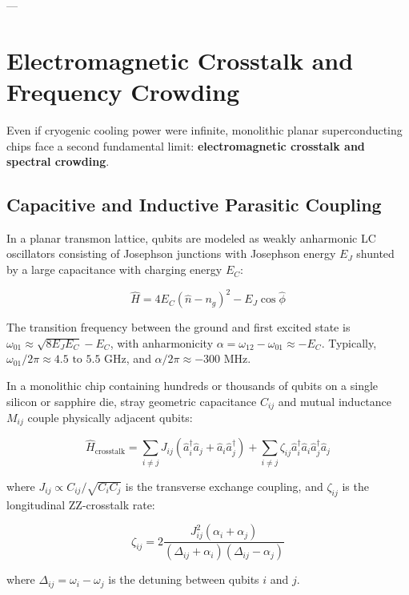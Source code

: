 ---

\section{Electromagnetic Crosstalk and Frequency Crowding}

Even if cryogenic cooling power were infinite, monolithic planar superconducting chips face a second fundamental limit: \textbf{electromagnetic crosstalk and spectral crowding}.

\subsection{Capacitive and Inductive Parasitic Coupling}
In a planar transmon lattice, qubits are modeled as weakly anharmonic LC oscillators consisting of Josephson junctions with Josephson energy $E_J$ shunted by a large capacitance with charging energy $E_C$:

\begin{equation}
    \hat{H} = 4 E_C (\hat{n} - n_g)^2 - E_J \cos \hat{\phi}
\end{equation}

The transition frequency between the ground and first excited state is $\omega_{01} \approx \sqrt{8 E_J E_C} - E_C$, with anharmonicity $\alpha = \omega_{12} - \omega_{01} \approx -E_C$. Typically, $\omega_{01} / 2\pi \approx 4.5\text{ to }5.5\text{ GHz}$, and $\alpha / 2\pi \approx -300\text{ MHz}$.

In a monolithic chip containing hundreds or thousands of qubits on a single silicon or sapphire die, stray geometric capacitance $C_{ij}$ and mutual inductance $M_{ij}$ couple physically adjacent qubits:

\begin{equation}
    \hat{H}_{\text{crosstalk}} = \sum_{i \neq j} J_{ij} (\hat{a}_i^\dagger \hat{a}_j + \hat{a}_i \hat{a}_j^\dagger) + \sum_{i \neq j} \zeta_{ij} \hat{a}_i^\dagger \hat{a}_i \hat{a}_j^\dagger \hat{a}_j
\end{equation}

where $J_{ij} \propto C_{ij} / \sqrt{C_i C_j}$ is the transverse exchange coupling, and $\zeta_{ij}$ is the longitudinal ZZ-crosstalk rate:

\begin{equation}
    \zeta_{ij} = 2 \frac{J_{ij}^2 (\alpha_i + \alpha_j)}{(\Delta_{ij} + \alpha_i)(\Delta_{ij} - \alpha_j)}
\end{equation}

where $\Delta_{ij} = \omega_i - \omega_j$ is the detuning between qubits $i$ and $j$.

